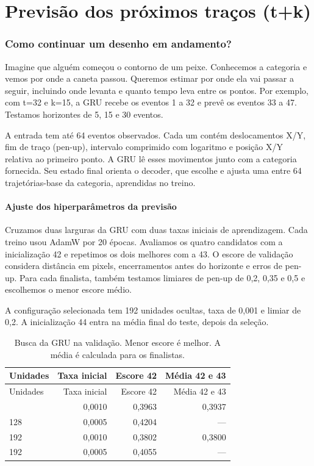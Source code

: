 \documentclass[11pt,a4paper]{article}
\begin{document}
\part{Previsão dos próximos traços (t+k)}
\section{Como continuar um desenho em andamento?}
Imagine que alguém começou o contorno de um peixe. Conhecemos a categoria e vemos por onde a caneta passou. Queremos estimar por onde ela vai passar a seguir, incluindo onde levanta e quanto tempo leva entre os pontos. Por exemplo, com t=32 e k=15, a GRU recebe os eventos 1 a 32 e prevê os eventos 33 a 47. Testamos horizontes de 5, 15 e 30 eventos.

A entrada tem até 64 eventos observados. Cada um contém deslocamentos X/Y, fim de traço (pen-up), intervalo comprimido com logaritmo e posição X/Y relativa ao primeiro ponto. A GRU lê esses movimentos junto com a categoria fornecida. Seu estado final orienta o decoder, que escolhe e ajusta uma entre 64 trajetórias-base da categoria, aprendidas no treino.
\subsection{Ajuste dos hiperparâmetros da previsão}
Cruzamos duas larguras da GRU com duas taxas iniciais de aprendizagem. Cada treino usou AdamW por 20 épocas. Avaliamos os quatro candidatos com a inicialização 42 e repetimos os dois melhores com a 43. O escore de validação considera distância em pixels, encerramentos antes do horizonte e erros de pen-up. Para cada finalista, também testamos limiares de pen-up de 0,2, 0,35 e 0,5 e escolhemos o menor escore médio.

A configuração selecionada tem 192 unidades ocultas, taxa de 0,001 e limiar de 0,2. A inicialização 44 entra na média final do teste, depois da seleção.
\begingroup\small\setlength{\tabcolsep}{4pt}\begin{longtable}{lrrr}
\caption{Busca da GRU na validação. Menor escore é melhor. A média é calculada para os finalistas.}\\
\toprule
Unidades & Taxa inicial & Escore 42 & Média 42 e 43 \\
\midrule\endfirsthead
\toprule
Unidades & Taxa inicial & Escore 42 & Média 42 e 43 \\
\midrule\endhead
\bottomrule\endfoot
128 & 0,0010 & 0,3963 & 0,3937 \\
128 & 0,0005 & 0,4204 & — \\
192 & 0,0010 & 0,3802 & 0,3800 \\
192 & 0,0005 & 0,4055 & — \\
\end{longtable}\endgroup
\end{document}

